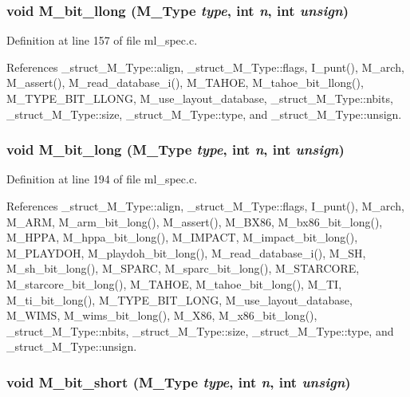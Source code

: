 \subsubsection{\setlength{\rightskip}{0pt plus 5cm}void M\_\-bit\_\-llong (\bf{M\_\-Type} {\em type}, int {\em n}, int {\em unsign})}\label{m__spec_8h_5a393ce907a4599ac6b997fb79ad38bf}




Definition at line 157 of file ml\_\-spec.c.

References \_\-struct\_\-M\_\-Type::align, \_\-struct\_\-M\_\-Type::flags, I\_\-punt(), M\_\-arch, M\_\-assert(), M\_\-read\_\-database\_\-i(), M\_\-TAHOE, M\_\-tahoe\_\-bit\_\-llong(), M\_\-TYPE\_\-BIT\_\-LLONG, M\_\-use\_\-layout\_\-database, \_\-struct\_\-M\_\-Type::nbits, \_\-struct\_\-M\_\-Type::size, \_\-struct\_\-M\_\-Type::type, and \_\-struct\_\-M\_\-Type::unsign.
\subsubsection{\setlength{\rightskip}{0pt plus 5cm}void M\_\-bit\_\-long (\bf{M\_\-Type} {\em type}, int {\em n}, int {\em unsign})}\label{m__spec_8h_9106c50101b71a03b2fbb31b7ac8e3b9}




Definition at line 194 of file ml\_\-spec.c.

References \_\-struct\_\-M\_\-Type::align, \_\-struct\_\-M\_\-Type::flags, I\_\-punt(), M\_\-arch, M\_\-ARM, M\_\-arm\_\-bit\_\-long(), M\_\-assert(), M\_\-BX86, M\_\-bx86\_\-bit\_\-long(), M\_\-HPPA, M\_\-hppa\_\-bit\_\-long(), M\_\-IMPACT, M\_\-impact\_\-bit\_\-long(), M\_\-PLAYDOH, M\_\-playdoh\_\-bit\_\-long(), M\_\-read\_\-database\_\-i(), M\_\-SH, M\_\-sh\_\-bit\_\-long(), M\_\-SPARC, M\_\-sparc\_\-bit\_\-long(), M\_\-STARCORE, M\_\-starcore\_\-bit\_\-long(), M\_\-TAHOE, M\_\-tahoe\_\-bit\_\-long(), M\_\-TI, M\_\-ti\_\-bit\_\-long(), M\_\-TYPE\_\-BIT\_\-LONG, M\_\-use\_\-layout\_\-database, M\_\-WIMS, M\_\-wims\_\-bit\_\-long(), M\_\-X86, M\_\-x86\_\-bit\_\-long(), \_\-struct\_\-M\_\-Type::nbits, \_\-struct\_\-M\_\-Type::size, \_\-struct\_\-M\_\-Type::type, and \_\-struct\_\-M\_\-Type::unsign.
\subsubsection{\setlength{\rightskip}{0pt plus 5cm}void M\_\-bit\_\-short (\bf{M\_\-Type} {\em type}, int {\em n}, int {\em unsign})}\label{m__spec_8h_df0a8bfa5b3207de53f5f25bf05adc14}




